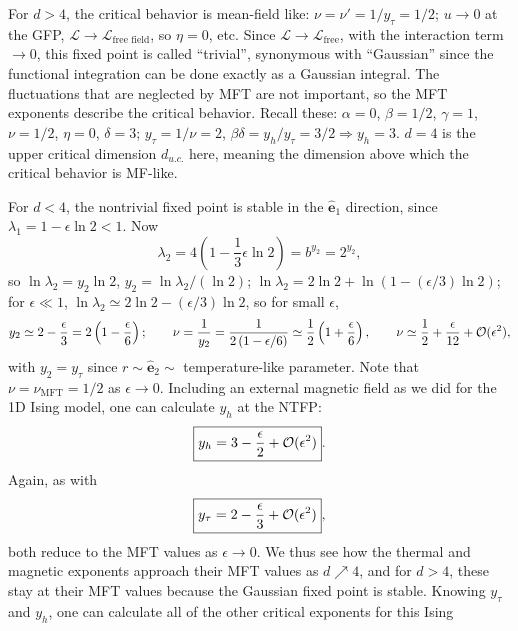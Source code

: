 For $d>4$, the critical behavior is mean-field like: $\nu = \nu' = 1/y_\tau = 1/2$; $u\to 0$ at the
GFP, $\mathcal L\to\mathcal L_{\text{free field}}$, so $\eta = 0$, etc. Since $\mathcal L\to\mathcal L_{\text{free}}$,
with the interaction term $\to 0$, this fixed point is called ``trivial'', synonymous with ``Gaussian'' since the
functional integration can be done exactly as a Gaussian integral. The fluctuations that are neglected by MFT are
not important, so the MFT exponents describe the critical behavior. Recall these: $\alpha = 0$, $\beta = 1/2$,
$\gamma = 1$, $\nu = 1/2$, $\eta = 0$, $\delta = 3$; $y_\tau = 1/\nu = 2$,
$\beta\delta = y_h/y_\tau = 3/2\Rightarrow y_h = 3$. $d = 4$ is the upper critical dimension
$d_{u.c.}$ here, meaning the dimension above which the critical behavior is MF-like.

For $d<4$, the nontrivial fixed point is stable in the $\hat{\mathbf e}_1$ direction, since
$\lambda_1 = 1-\epsilon\ln 2<1$. Now
\begin{equation}
  \lambda_2 = 4\left(1-\frac{1}{3}\epsilon\ln 2\right) = b^{y_2} = 2^{y_2},
\end{equation}
so $\ln\lambda_2 = y_2\ln 2$, $y_2 = \ln\lambda_2/(\ln 2)$;
$\ln\lambda_2 = 2\ln 2 + \ln\left(1-(\epsilon/3)\ln 2\right)$; for $\epsilon\ll 1$,
$\ln\lambda_2\simeq 2\ln 2-(\epsilon/3)\ln 2$, so for small $\epsilon$,
\begin{equation}
  y_2\simeq 2-\frac{\epsilon}{3} = 2\left(1-\frac{\epsilon}{6}\right);\qquad
  \nu = \frac{1}{y_2} = \frac{1}{2\left(1-\epsilon/6\right)}\simeq\frac{1}{2}\left(1+\frac{\epsilon}{6}\right),\qquad
  \nu\simeq\frac{1}{2}+\frac{\epsilon}{12}+\mathcal{O}(\epsilon^2),
\end{equation}
with $y_2 = y_\tau$ since $r\sim\hat{\mathbf e}_2\sim$ temperature-like parameter. Note that
$\nu = \nu_{\text{MFT}} = 1/2$ as $\epsilon\to 0$. Including an external magnetic field as we did for the 1D
Ising model, one can calculate $y_h$ at the NTFP:
\begin{equation}
  \boxed{y_h = 3-\frac{\epsilon}{2}+\mathcal{O}(\epsilon^2)}.
\end{equation}
Again, as with
\begin{equation}
  \boxed{y_\tau = 2-\frac{\epsilon}{3}+\mathcal{O}(\epsilon^2)},
\end{equation}
both reduce to the MFT values as $\epsilon\to 0$. We thus see how the thermal and magnetic exponents approach
their MFT values as $d\nearrow 4$, and for $d>4$, these stay at their MFT values because the Gaussian fixed point
is stable. Knowing $y_\tau$ and $y_h$, one can calculate all of the other critical exponents for this Ising
